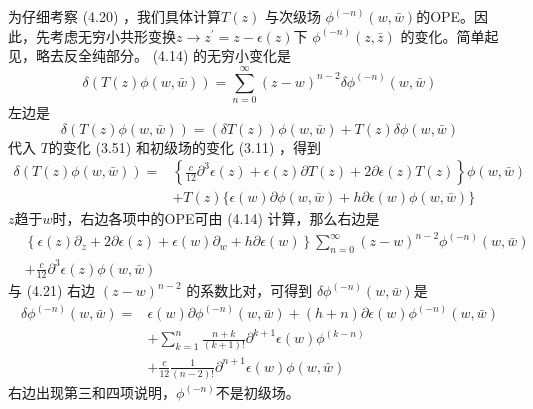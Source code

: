为仔细考察 (4.20) ，我们具体计算$ T(z)$ 与次级场 $\phi^{(-n)}(w, \bar{w}) $的OPE。因此，先考虑无穷小共形变换$ z \rightarrow z^{\prime}=z-\epsilon(z) $下 $\phi^{(-n)}(z, \bar{z})$ 的变化。简单起见，略去反全纯部分。 (4.14) 的无穷小变化是
\begin{equation}
\delta(T(z) \phi(w, \bar{w}))=\sum_{n=0}^{\infty}(z-w)^{n-2} \delta \phi^{(-n)}(w, \bar{w})
\end{equation}
左边是
\begin{equation}
	\delta(T(z) \phi(w, \bar{w}))=(\delta T(z)) \phi(w, \bar{w})+T(z) \delta \phi(w, \bar{w})
\end{equation}
代入 $T $的变化 (3.51) 和初级场的变化 (3.11) ，得到
\begin{equation}
	\begin{aligned} \delta(T(z) \phi(w, \bar{w}))=&\left\{\frac{c}{12} \partial^{3} \epsilon(z)+\epsilon(z) \partial T(z)+2 \partial \epsilon(z) T(z)\right\} \phi(w, \bar{w}) \\ &+T(z)\{\epsilon(w) \partial \phi(w, \bar{w})+h \partial \epsilon(w) \phi(w, \bar{w})\} \end{aligned}
\end{equation}
$z $趋于$ w $时，右边各项中的OPE可由 (4.14) 计算，那么右边是
\begin{equation}
	\begin{aligned} &\left\{\epsilon(z) \partial_{z}+2 \partial \epsilon(z)+\epsilon(w) \partial_{w}+h \partial \epsilon(w)\right\} \sum_{n=0}^{\infty}(z-w)^{n-2} \phi^{(-n)}(w, \bar{w})\\ &+\frac{c}{12} \partial^{3} \epsilon(z) \phi(w, \bar{w}) \end{aligned}
\end{equation}
与 (4.21) 右边 $(z-w)^{n-2}$ 的系数比对，可得到 $\delta \phi^{(-n)}(w, \bar{w}) $是
\begin{equation}
	\begin{aligned} \delta \phi^{(-n)}(w, \bar{w})=& \epsilon(w) \partial \phi^{(-n)}(w, \bar{w})+(h+n) \partial \epsilon(w) \phi^{(-n)}(w, \bar{w}) \\ &+\sum_{k=1}^{n} \frac{n+k}{(k+1) !} \partial^{k+1} \epsilon(w) \phi^{(k-n)} \\ &+\frac{c}{12} \frac{1}{(n-2) !} \partial^{n+1} \epsilon(w) \phi(w, \bar{w}) \end{aligned}
\end{equation}
右边出现第三和四项说明，$ \phi^{(-n)} $不是初级场。

